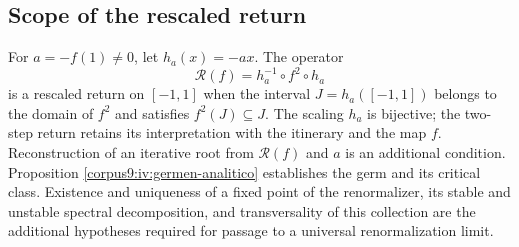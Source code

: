 \subsection{Scope of the rescaled return}
For \(a=-f(1)\ne0\), let \(h_a(x)=-ax\). The operator
\[
 \mathcal R(f)=h_a^{-1}\circ f^2\circ h_a
\]
is a rescaled return on \([-1,1]\) when the interval
\(J=h_a([-1,1])\) belongs to the domain of \(f^2\) and
satisfies \(f^2(J)\subseteq J\). The scaling \(h_a\) is
bijective; the two-step return retains its interpretation
with the itinerary and the map \(f\). Reconstruction of an
iterative root from \(\mathcal R(f)\) and \(a\) is an
additional condition. Proposition
\ref{corpus9:iv:germen-analitico} establishes the germ and
its critical class. Existence and uniqueness of a fixed point
of the renormalizer, its stable and unstable spectral
decomposition, and transversality of this collection are the
additional hypotheses required for passage to a universal
renormalization limit.
